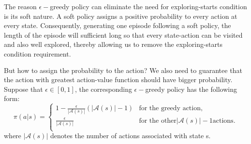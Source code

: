 The reason $\epsilon-$greedy policy can eliminate the need for exploring-starts condition is its soft nature. A soft policy assigns a positive
probability to every action at every state. Consequently, generating one episode following a soft policy, the length of the episode will
sufficient long so that every state-action can be visited and also well explored, thereby allowing us to remove the exploring-starts condition
requirement.

But how to assign the probability to the action? We also need to guarantee that the action with greatest action-value function should have
bigger probability. Suppose that $\epsilon \in[0,1]$, the corresponding $\epsilon-$greedy policy has the following form:
\begin{equation*}
	\pi(a|s) =
	\begin{cases}
		1-\frac{\epsilon}{\left|\mathcal{A}(s)\right|}\left(\left|\mathcal{A}(s)\right|-1\right) & \text{for the greedy action},                                      \\
		\frac{\epsilon}{\left|\mathcal{A}(s)\right|}                                             & \text{for the other} \left|\mathcal{A}(s)\right|-1 \text{actions}. \\
	\end{cases}
\end{equation*}
where $\left|\mathcal{A}(s)\right|$ denotes the number of actions associated with state s. \par

